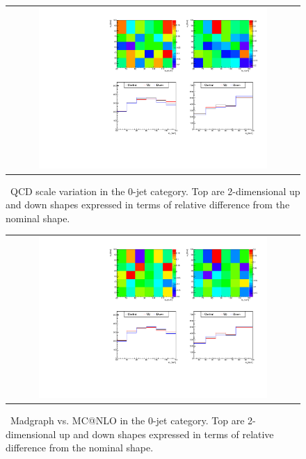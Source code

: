 %
\begin{figure}[htp]
\centering
\begin{tabular}{c}
\includegraphics[width=0.8\textwidth]{figures/histo_qqWW_CMS_hww_MVAWWNLOBounding_0j_zoom.pdf}
\end{tabular}
\caption{ \qqww\ QCD scale variation in the 0-jet category.
         Top are 2-dimensional up and down shapes expressed in terms of relative 
         difference from the nominal shape.}
\label{fig:alter_qqwwnlo}
\end{figure}
%
\begin{figure}[htp]
\centering
\begin{tabular}{c}
\includegraphics[width=0.8\textwidth]{figures/histo_qqWW_CMS_hww_MVAWWBounding_0j_zoom.pdf}
\end{tabular}
\caption{ \qqww\ Madgraph vs. MC@NLO in the 0-jet category.
         Top are 2-dimensional up and down shapes expressed in terms of relative 
         difference from the nominal shape.}
\label{fig:alter_qqww}
\end{figure}
%
